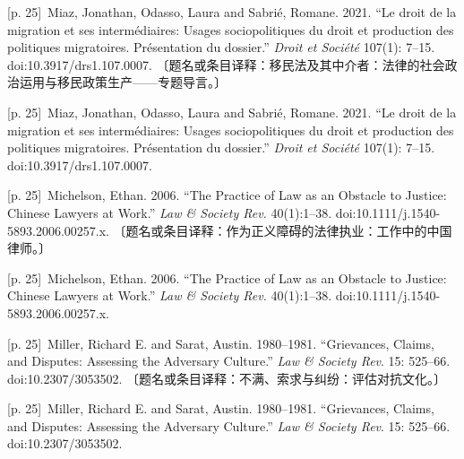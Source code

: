 \documentclass[10pt,a4paper]{article}
\begin{document}
\noindent\begin{minipage}{\textwidth}\begin{minipage}[t]{\dimexpr.5\textwidth-4mm\relax}{\scriptsize\color{gray} [p. 25]}\ Miaz, Jonathan, Odasso, Laura and Sabrié, Romane. 2021. “Le droit de la migration et ses intermédiaires: Usages sociopolitiques du droit et production des politiques migratoires. Présentation du dossier.” \textit{Droit et Société} 107(1): 7–15. doi:10.3917/drs1.107.0007. 〔题名或条目译释：移民法及其中介者：法律的社会政治运用与移民政策生产——专题导言。〕\par\end{minipage}\hfill\begin{minipage}[t]{\dimexpr.5\textwidth-4mm\relax}{\scriptsize\color{gray} [p. 25]}\ Miaz, Jonathan, Odasso, Laura and Sabrié, Romane. 2021. “Le droit de la migration et ses intermédiaires: Usages sociopolitiques du droit et production des politiques migratoires. Présentation du dossier.” \textit{Droit et Société} 107(1): 7–15. doi:10.3917/drs1.107.0007.\par\end{minipage}\end{minipage}\par
\noindent\begin{minipage}{\textwidth}\begin{minipage}[t]{\dimexpr.5\textwidth-4mm\relax}{\scriptsize\color{gray} [p. 25]}\ Michelson, Ethan. 2006. “The Practice of Law as an Obstacle to Justice: Chinese Lawyers at Work.” \textit{Law \& Society Rev.} 40(1):1–38. doi:10.1111/j.1540-5893.2006.00257.x. 〔题名或条目译释：作为正义障碍的法律执业：工作中的中国律师。〕\par\end{minipage}\hfill\begin{minipage}[t]{\dimexpr.5\textwidth-4mm\relax}{\scriptsize\color{gray} [p. 25]}\ Michelson, Ethan. 2006. “The Practice of Law as an Obstacle to Justice: Chinese Lawyers at Work.” \textit{Law \& Society Rev.} 40(1):1–38. doi:10.1111/j.1540-5893.2006.00257.x.\par\end{minipage}\end{minipage}\par
\noindent\begin{minipage}{\textwidth}\begin{minipage}[t]{\dimexpr.5\textwidth-4mm\relax}{\scriptsize\color{gray} [p. 25]}\ Miller, Richard E. and Sarat, Austin. 1980–1981. “Grievances, Claims, and Disputes: Assessing the Adversary Culture.” \textit{Law \& Society Rev}. 15: 525–66. doi:10.2307/3053502. 〔题名或条目译释：不满、索求与纠纷：评估对抗文化。〕\par\end{minipage}\hfill\begin{minipage}[t]{\dimexpr.5\textwidth-4mm\relax}{\scriptsize\color{gray} [p. 25]}\ Miller, Richard E. and Sarat, Austin. 1980–1981. “Grievances, Claims, and Disputes: Assessing the Adversary Culture.” \textit{Law \& Society Rev}. 15: 525–66. doi:10.2307/3053502.\par\end{minipage}\end{minipage}\par
\end{document}
